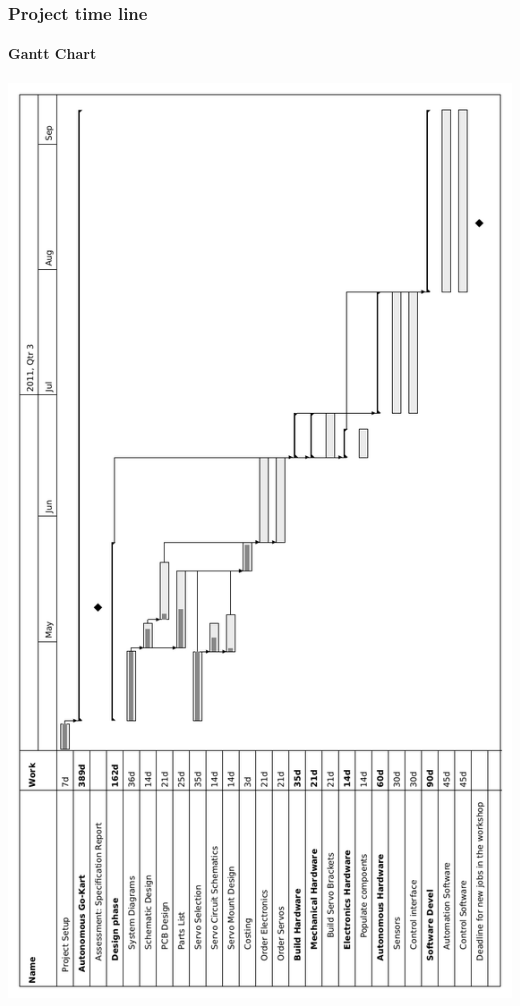 \documentclass{beamer}
\begin{document}
\begin{frame}
\frametitle{Project time line}
\framesubtitle{Gantt Chart}
    \begin{center}
      \includegraphics[angle=270,width=.95\textwidth]{Images/Gantt}
    \end{center}
\end{frame}
\end{document}
